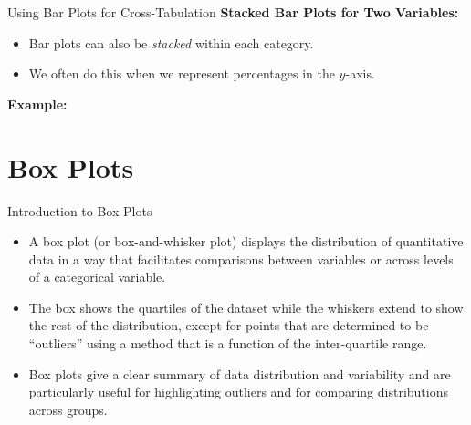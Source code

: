 \documentclass[handout]{beamer} %
\begin{document}
\begin{frame}{Using Bar Plots for Cross-Tabulation}
    \textbf{Stacked Bar Plots for Two Variables:}
    \begin{itemize}
        \item Bar plots can also be \emph{stacked} within each category.
        \item We often do this when we represent percentages in the $y$-axis.
    \end{itemize}

    \textbf{Example:}
    \begin{center}
    \end{center}

\end{frame}

\section{Box Plots}

\begin{frame}{Introduction to Box Plots}
    \begin{itemize}
        \item A box plot (or box-and-whisker plot) displays the distribution of quantitative data in a way that facilitates comparisons between variables or across levels of a categorical variable.
        \item The box shows the quartiles of the dataset while the whiskers extend to show the rest of the distribution, except for points that are determined to be “outliers” using a method that is a function of the inter-quartile range.
        \item Box plots give a clear summary of data distribution and variability and are particularly useful for highlighting outliers and for comparing distributions across groups.
    \end{itemize}
\end{frame}
\end{document}
